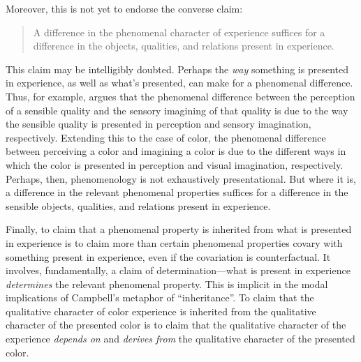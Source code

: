 \documentclass[12pt]{article}
\begin{document}
Moreover, this is not yet to endorse the converse claim:
\begin{quote}
    A difference in the phenomenal character of experience suffices for a difference in the objects, qualities, and relations present in experience. 
\end{quote}
This claim may be intelligibly doubted. Perhaps the \emph{way} something is presented in experience, as well as what's presented, can make for a phenomenal difference. Thus, for example, \citet{Martin:2002cr} argues that the phenomenal difference between the perception of a sensible quality and the sensory imagining of that quality is due to the way the sensible quality is presented in perception and sensory imagination, respectively. Extending this to the case of color, the phenomenal difference between perceiving a color and imagining a color is due to the different ways in which the color is presented in perception and visual imagination, respectively. Perhaps, then, phenomenology is not exhaustively presentational. But where it is, a difference in the relevant phenomenal properties suffices for a difference in the sensible objects, qualities, and relations present in experience.

Finally, to claim that a phenomenal property is inherited from what is presented in experience is to claim more than certain phenomenal properties covary with something present in experience, even if the covariation is counterfactual. It involves, fundamentally, a claim of determination---what is present in experience \emph{determines} the relevant phenomenal property. This is implicit in the modal implications of Campbell's metaphor of ``inheritance''. To claim that the qualitative character of color experience is inherited from the qualitative character of the presented color is to claim that the qualitative character of the experience \emph{depends on} and \emph{derives from} the qualitative character of the presented color. 
\end{document}
